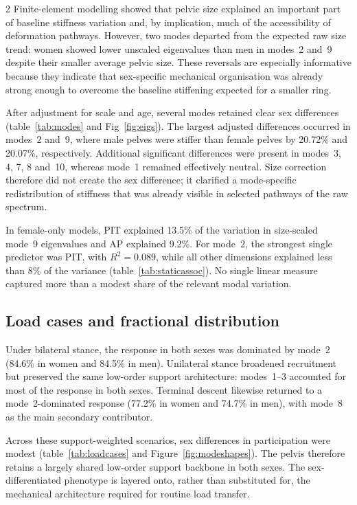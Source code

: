 \documentclass[openacc]{rsproca_new}
\begin{document}
\begin{multicols}{2}
Finite-element modelling showed that pelvic size explained an important part of baseline stiffness variation and, by implication, much of the accessibility of deformation pathways. However, two modes departed from the expected raw size trend: women showed lower unscaled eigenvalues than men in modes~2 and~9 despite their smaller average pelvic size. These reversals are especially informative because they indicate that sex-specific mechanical organisation was already strong enough to overcome the baseline stiffening expected for a smaller ring.

After adjustment for scale and age, several modes retained clear sex differences (table~\ref{tab:modes} and Fig~\ref{fig:eigs}). The largest adjusted differences occurred in modes~2 and~9, where male pelves were stiffer than female pelves by 20.72\% and 20.07\%, respectively. Additional significant differences were present in modes~3, 4, 7, 8 and~10, whereas mode~1 remained effectively neutral. Size correction therefore did not create the sex difference; it clarified a mode-specific redistribution of stiffness that was already visible in selected pathways of the raw spectrum.

In female-only models, PIT explained 13.5\% of the variation in size-scaled mode~9 eigenvalues and AP explained 9.2\%. For mode~2, the strongest single predictor was PIT, with $R^2=0.089$, while all other dimensions explained less than 8\% of the variance (table~\ref{tab:staticassoc}). No single linear measure captured more than a modest share of the relevant modal variation.

\subsection{Load cases and fractional distribution}

Under bilateral stance, the response in both sexes was dominated by mode~2 (84.6\% in women and 84.5\% in men). Unilateral stance broadened recruitment but preserved the same low-order support architecture: modes~1--3 accounted for most of the response in both sexes. Terminal descent likewise returned to a mode~2-dominated response (77.2\% in women and 74.7\% in men), with mode~8 as the main secondary contributor.

Across these support-weighted scenarios, sex differences in participation were modest (table~\ref{tab:loadcases} and Figure~\ref{fig:modeshapes}). The pelvis therefore retains a largely shared low-order support backbone in both sexes. The sex-differentiated phenotype is layered onto, rather than substituted for, the mechanical architecture required for routine load transfer.


\end{multicols}
\end{document}
